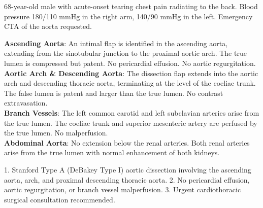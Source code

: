 \begin{testbox}[Indications:]
68-year-old male with acute-onset tearing chest pain radiating to the back. Blood pressure 180/110 mmHg in the right arm, 140/90 mmHg in the left. Emergency CTA of the aorta requested.
\end{testbox}
\begin{refbox}[Findings:]
\textbf{Ascending Aorta}: An intimal flap is identified in the ascending aorta, extending from the sinotubular junction to the proximal aortic arch. The true lumen is compressed but patent. No pericardial effusion. No aortic regurgitation.\\
\textbf{Aortic Arch \& Descending Aorta}: The dissection flap extends into the aortic arch and descending thoracic aorta, terminating at the level of the coeliac trunk. The false lumen is patent and larger than the true lumen. No contrast extravasation.\\
\textbf{Branch Vessels}: The left common carotid and left subclavian arteries arise from the true lumen. The coeliac trunk and superior mesenteric artery are perfused by the true lumen. No malperfusion.\\
\textbf{Abdominal Aorta}: No extension below the renal arteries. Both renal arteries arise from the true lumen with normal enhancement of both kidneys.
\end{refbox}
\begin{pearlbox}[Impression:]
1. Stanford Type A (DeBakey Type I) aortic dissection involving the ascending aorta, arch, and proximal descending thoracic aorta.
2. No pericardial effusion, aortic regurgitation, or branch vessel malperfusion.
3. Urgent cardiothoracic surgical consultation recommended.
\end{pearlbox}

\clearpage
